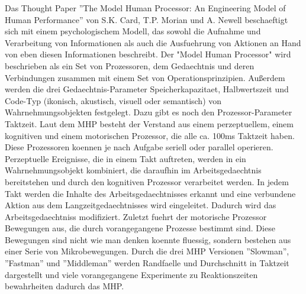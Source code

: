 \documentclass[a4paper,10pt]{article}
\begin{document}
\kopf
\renewcommand{\figurename}{Figure}



Das Thought Paper ''The Model Human Processor: An Engineering Model of Human Performance'' von S.K. Card, T.P. Morian und A. Newell beschaeftigt sich mit einem psychologischem Modell, das sowohl die Aufnahme und Verarbeitung von Informationen als auch die Ausfuehrung von Aktionen an Hand von eben diesen Informationen beschreibt.
Der "Model Human Processor" wird beschrieben als ein Set von Prozessoren, dem Gedaechtnis und deren Verbindungen zusammen mit einem Set von Operationsprinzipien. Außerdem werden die drei Gedaechtnis-Parameter Speicherkapazitaet, Halbwertszeit und Code-Typ (ikonisch, akustisch, visuell oder semantisch) von Wahrnehmungsobjekten festgelegt. Dazu gibt es noch den Prozessor-Parameter Taktzeit.
Laut dem MHP besteht der Verstand aus einem perzeptuellem, einem kognitiven und einem motorischen Prozessor, die alle ca. 100ms Taktzeit haben. Diese Prozessoren koennen je nach Aufgabe seriell oder parallel operieren. Perzeptuelle Ereignisse, die in einem Takt auftreten, werden in ein Wahrnehmungsobjekt kombiniert, die daraufhin im Arbeitsgedaechtnis bereitstehen und durch den kognitiven Prozessor verarbeitet werden. In jedem Takt werden die Inhalte des Arbeitsgedaechtnisses erkannt und eine verbundene Aktion aus dem Langzeitgedaechtnisses wird eingeleitet. Dadurch wird das Arbeitsgedaechtniss modifiziert. Zuletzt fuehrt der motorische Prozessor Bewegungen aus, die durch vorangegangene Prozesse bestimmt sind. Diese Bewegungen sind nicht wie man denken koennte fluessig, sondern bestehen aus einer Serie von Mikrobewegungen.
Durch die drei MHP Versionen ''Slowman'', ''Fastman'' und ''Middleman'' werden Randfaelle und Durchschnitt in Taktzeit dargestellt und viele vorangegangene Experimente zu Reaktionszeiten bewahrheiten dadurch das MHP.
\end{document}
